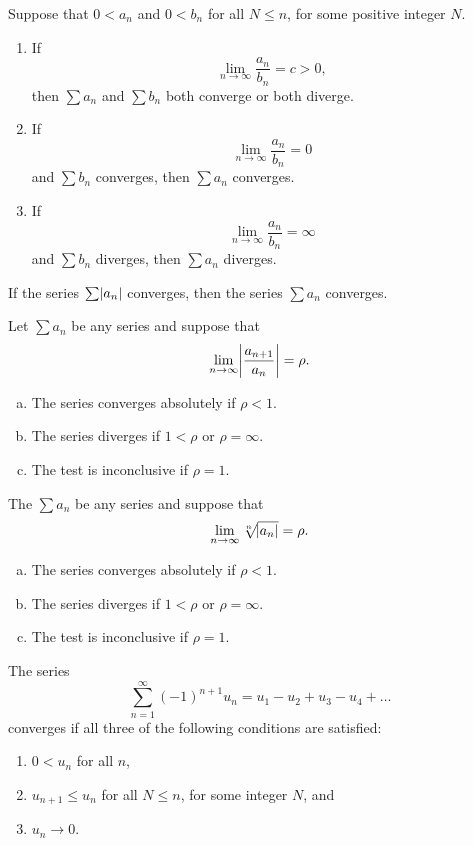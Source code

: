 \documentclass[12pt]{amsart}
\begin{document}
\begin{thm}
  Suppose that \(0 < a_n\) and \(0 < b_n\) for all \(N \leq n\), for some positive integer \(N\).
  \begin{enumerate}
  \item
    If
    \[\lim_{n \to \infty} \frac{a_n}{b_n} = c > 0,\]
    then \(\sum a_n\) and \(\sum b_n\) both converge or both diverge.
  \item
    If
    \[\lim_{n \to \infty} \frac{a_n}{b_n} = 0\]
    and \(\sum b_n\) converges, then \(\sum a_n\) converges.
  \item
    If
    \[\lim_{n \to \infty} \frac{a_n}{b_n} = \infty\]
    and \(\sum b_n\) diverges, then \(\sum a_n\) diverges.
  \end{enumerate}
\end{thm}

\begin{thm}
  If the series \(\sum \abs{a_n}\) converges, then the series \(\sum a_n\) converges.
\end{thm}

\begin{thm}
  Let \(\sum a_n\) be any series and suppose that
  \[\lim_{n \to \infty} \abs{\frac{a_{n+1}}{a_n}} = \rho.\]
  \begin{enumerate}[(a)]
  \item
    The series converges absolutely if \(\rho < 1\).
  \item
    The series diverges if \(1 < \rho\) or \(\rho = \infty\).
  \item
    The test is inconclusive if \(\rho = 1\).
  \end{enumerate}
\end{thm}

\begin{thm}
  The \(\sum a_n\) be any series and suppose that
  \[\lim_{n \to \infty} \sqrt[n]{\abs{a_n}} = \rho.\]
  \begin{enumerate}[(a)]
  \item
    The series converges absolutely if \(\rho < 1\).
  \item
    The series diverges if \(1 < \rho\) or \(\rho = \infty\).
  \item
    The test is inconclusive if \(\rho = 1\).
  \end{enumerate}
\end{thm}

\begin{thm}
  The series
  \[\sum_{n = 1}^\infty (-1)^{n+1} u_n = u_1 - u_2 + u_3 - u_4 + \ldots\]
  converges if all three of the following conditions are satisfied:
  \begin{enumerate}
  \item
    \(0 < u_n\) for all \(n\),
  \item
    \(u_{n + 1} \leq u_n\) for all \(N \leq n\), for some integer \(N\), and
  \item
    \(u_n \to 0\).
  \end{enumerate}
\end{thm}
\end{document}
